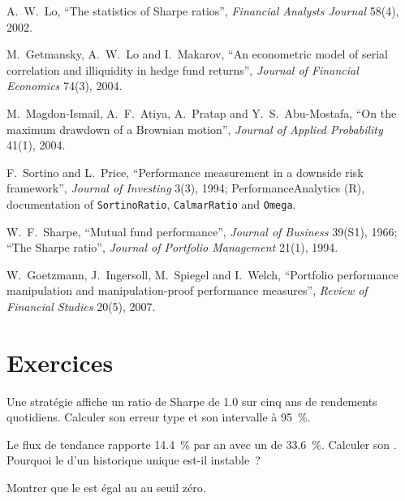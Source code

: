 \begin{omsources}
\item A.~W.~Lo, ``The statistics of Sharpe ratios'', \emph{Financial Analysts Journal} 58(4), 2002.
\item M.~Getmansky, A.~W.~Lo and I.~Makarov, ``An econometric model of serial correlation and illiquidity in hedge fund returns'', \emph{Journal of Financial
Economics} 74(3), 2004.
\item M.~Magdon-Ismail, A.~F.~Atiya, A.~Pratap and Y.~S.~Abu-Mostafa, ``On the maximum drawdown of a Brownian motion'', \emph{Journal of Applied Probability}
41(1), 2004.
\item F.~Sortino and L.~Price, ``Performance measurement in a downside risk framework'', \emph{Journal of Investing} 3(3), 1994; PerformanceAnalytics (R),
documentation of \texttt{SortinoRatio}, \texttt{CalmarRatio} and \texttt{Omega}.
\item W.~F.~Sharpe, ``Mutual fund performance'', \emph{Journal of Business} 39(S1), 1966; ``The Sharpe ratio'', \emph{Journal of Portfolio Management}
21(1), 1994.
\item W.~Goetzmann, J.~Ingersoll, M.~Spiegel and I.~Welch, ``Portfolio performance manipulation and manipulation-proof performance measures'', \emph{Review of
Financial Studies} 20(5), 2007.
\end{omsources}

\section{Exercices}

\begin{exercise}[$\star$]\label{exo:rs:performance-measurement:1}
Une stratégie affiche un ratio de Sharpe de 1.0 sur cinq ans de rendements quotidiens. Calculer son erreur type et son intervalle à 95~\%.
\end{exercise}

\begin{exercise}[$\star$]\label{exo:rs:performance-measurement:2}
Le flux de tendance rapporte 14.4~\% par an avec un  de 33.6~\%. Calculer son . Pourquoi le  d'un historique unique est-il instable~?
\end{exercise}

\begin{exercise}[$\star$]\label{exo:rs:performance-measurement:3}
Montrer que le  est égal au  au seuil zéro.
\end{exercise}

